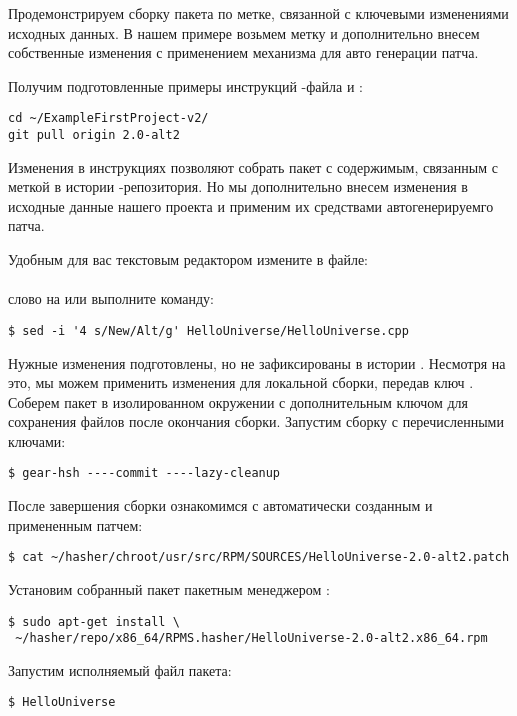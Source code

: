 Продемонстрируем сборку пакета по метке, связанной с ключевыми изменениями исходных
данных. В нашем примере возьмем метку  и дополнительно внесем собственные
изменения с применением механизма  для авто генерации патча.

Получим подготовленные примеры инструкций -файла и :

\begin{verbatim}
cd ~/ExampleFirstProject-v2/
git pull origin 2.0-alt2
\end{verbatim}

Изменения в инструкциях позволяют собрать пакет с содержимым, связанным с меткой
 в истории -репозитория. Но мы дополнительно внесем изменения
в исходные данные нашего проекта и применим их средствами автогенерируемго патча.

Удобным для вас текстовым редактором измените в файле:\\
\\
слово  на  или выполните команду:
\begin{verbatim}
$ sed -i '4 s/New/Alt/g' HelloUniverse/HelloUniverse.cpp
\end{verbatim}

Нужные изменения подготовлены, но не зафиксированы в истории . Несмотря на это,
мы можем применить изменения для локальной сборки, передав  ключ .
Соберем пакет в изолированном окружении с  дополнительным ключом  для
сохранения файлов после окончания сборки.
Запустим сборку с перечисленными ключами:
\begin{verbatim}
$ gear-hsh ----commit ----lazy-cleanup
\end{verbatim}

После завершения сборки ознакомимся с автоматически созданным и примененным патчем:
\begin{verbatim}
$ cat ~/hasher/chroot/usr/src/RPM/SOURCES/HelloUniverse-2.0-alt2.patch
\end{verbatim}

Установим  собранный пакет пакетным менеджером :
\begin{verbatim}
$ sudo apt-get install \
 ~/hasher/repo/x86_64/RPMS.hasher/HelloUniverse-2.0-alt2.x86_64.rpm
\end{verbatim}

Запустим исполняемый файл пакета:
\begin{verbatim}
$ HelloUniverse
\end{verbatim}

